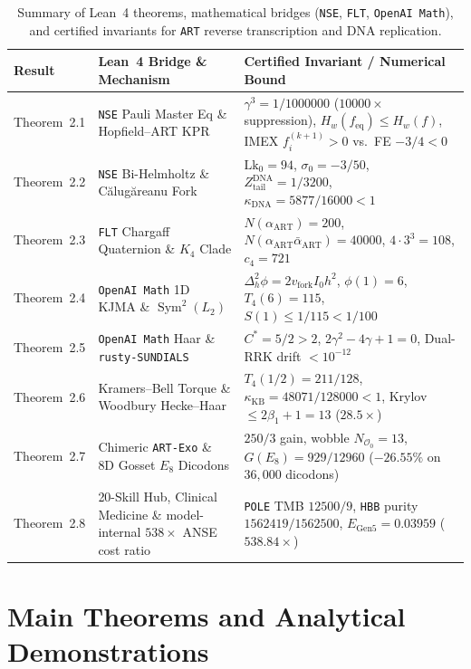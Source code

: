 \documentclass[11pt,a4paper]{article}
\renewcommand{\arraystretch}{1.35}
\theoremstyle{definition}
\begin{document}
\begin{table}[htbp]
\centering
\caption{Summary of Lean~4 theorems, mathematical bridges (\texttt{NSE}, \texttt{FLT}, \texttt{OpenAI Math}), and certified invariants for \texttt{ART} reverse transcription and DNA replication.}
\label{tab:paper_e_summary}
\renewcommand{\arraystretch}{1.35}
\footnotesize
\begin{tabularx}{\textwidth}{@{}llX@{}}
\toprule
\textbf{Result} & \textbf{Lean~4 Bridge \& Mechanism} & \textbf{Certified Invariant / Numerical Bound} \\
\midrule
Theorem~2.1 & \texttt{NSE} Pauli Master Eq \& Hopfield--ART KPR & $\gamma^3 = 1/1000000$ ($10000\times$ suppression), $H_w(f_{\mathrm{eq}}) \le H_w(f)$, IMEX $f_i^{(k+1)} > 0$ vs.\ FE $-3/4 < 0$ \\
Theorem~2.2 & \texttt{NSE} Bi-Helmholtz \& C\u{a}lug\u{a}reanu Fork & $\mathrm{Lk}_0 = 94$, $\sigma_0 = -3/50$, $Z_{\mathrm{tail}}^{\mathrm{DNA}} = 1/3200$, $\kappa_{\mathrm{DNA}} = 5877/16000 < 1$ \\
Theorem~2.3 & \texttt{FLT} Chargaff Quaternion \& $K_4$ Clade & $N(\alpha_{\mathrm{ART}}) = 200$, $N(\alpha_{\mathrm{ART}}\bar{\alpha}_{\mathrm{ART}}) = 40000$, $4\cdot 3^3 = 108$, $c_4 = 721$ \\
Theorem~2.4 & \texttt{OpenAI Math} 1D KJMA \& $\operatorname{Sym}^2(L_2)$ & $\Delta_h^2\phi = 2 v_{\mathrm{fork}}I_0 h^2$, $\phi(1) = 6$, $T_4(6) = 115$, $S(1) \le 1/115 < 1/100$ \\
Theorem~2.5 & \texttt{OpenAI Math} Haar \& \texttt{rusty-SUNDIALS} & $C^* = 5/2 > 2$, $2\gamma^2 - 4\gamma + 1 = 0$, Dual-RRK drift $< 10^{-12}$ \\
Theorem~2.6 & Kramers--Bell Torque \& Woodbury Hecke--Haar & $T_4(1/2) = 211/128$, $\kappa_{\mathrm{KB}} = 48071/128000 < 1$, Krylov $\le 2\beta_1 + 1 = 13$ ($28.5\times$) \\
Theorem~2.7 & Chimeric \texttt{ART-Exo} \& 8D Gosset $E_8$ Dicodons & $250/3$ gain, wobble $N_{\mathcal{O}_0} = 13$, $G(E_8) = 929/12960$ ($-26.55\%$ on $36{,}000$ dicodons) \\
Theorem~2.8 & 20-Skill Hub, Clinical Medicine \& model-internal $538\times$ ANSE cost ratio & \texttt{POLE} TMB $12500/9$, \texttt{HBB} purity $1562419/1562500$, $E_{\mathrm{Gen5}} = 0.03959$ ($538.84\times$) \\
\bottomrule
\end{tabularx}
\end{table}

\section{Main Theorems and Analytical Demonstrations}
\end{document}
